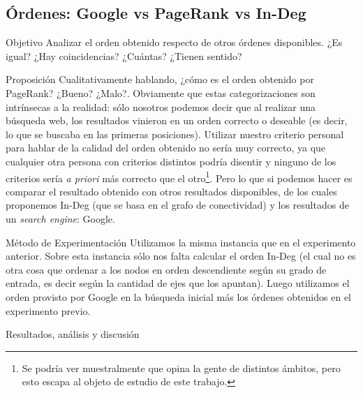 \subsection{\'Ordenes: Google vs PageRank vs In-Deg}
\label{subsec:exp2}
\begin{LaTeXdescription}
    \item[Objetivo] Analizar el orden obtenido respecto de otros \'ordenes
        disponibles. ¿Es igual? ¿Hay coincidencias? ¿Cu\'antas? ¿Tienen
        sentido?\\

    \item[Proposici\'on] Cualitativamente hablando, ¿c\'omo es el orden obtenido
        por PageRank? ¿Bueno? ¿Malo?. Obviamente que estas categorizaciones son
        intr\'insecas a la realidad: s\'olo nosotros podemos decir que al
        realizar una b\'usqueda web, los resultados vinieron en un orden
        correcto o deseable (es decir, lo que se buscaba en las primeras
        posiciones).  Utilizar nuestro criterio personal para hablar de la
        calidad del orden obtenido no ser\'ia muy correcto, ya que cualquier
        otra persona con criterios distintos podr\'ia disentir y ninguno de los
        criterios ser\'ia \textit{a priori} m\'as correcto que el
        otro\footnote{Se podr\'ia ver muestralmente que opina la gente de
        distintos \'ambitos, pero esto escapa al objeto de estudio de este
        trabajo.}. Pero lo que si podemos hacer es comparar el resultado
        obtenido con otros resultados disponibles, de los cuales proponemos
        In-Deg (que se basa en el grafo de conectividad) y los resultados de un
        \textit{search engine}: Google.\\

    \item[M\'etodo de Experimentaci\'on] Utilizamos la misma instancia que en el
        experimento anterior. Sobre esta instancia s\'olo nos falta calcular el
        orden In-Deg (el cual no es otra cosa que ordenar a los nodos en orden
        descendiente seg\'un su grado de entrada, es decir seg\'un la cantidad
        de ejes que los apuntan). Luego utilizamos el orden provisto por Google
        en la b\'usqueda inicial m\'as los \'ordenes obtenidos en el experimento
        previo.\\

    \item[Resultados, an\'alisis y discusi\'on]
\end{LaTeXdescription}

